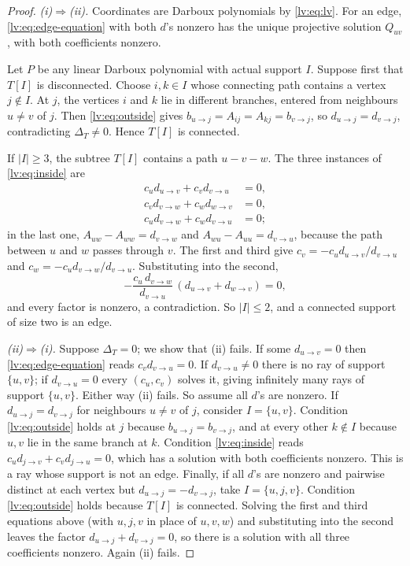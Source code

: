 \documentclass[11pt,a4paper]{article}
\theoremstyle{definition}
\theoremstyle{remark}
\begin{document}
\begin{proof}
\emph{(i)$\Rightarrow$(ii).} Coordinates are Darboux polynomials by \eqref{lv:eq:lv}. For an edge, \eqref{lv:eq:edge-equation} with both $d$'s nonzero has the unique projective solution $Q_{uv}$, with both coefficients nonzero.

Let $P$ be any linear Darboux polynomial with actual support $I$. Suppose first that $T[I]$ is disconnected. Choose $i,k\in I$ whose connecting path contains a vertex $j\notin I$. At $j$, the vertices $i$ and $k$ lie in different branches, entered from neighbours $u\neq v$ of $j$. Then \eqref{lv:eq:outside} gives $b_{u\to j}=A_{ij}=A_{kj}=b_{v\to j}$, so $d_{u\to j}=d_{v\to j}$, contradicting $\Delta_T\neq0$. Hence $T[I]$ is connected.

If $|I|\geq3$, the subtree $T[I]$ contains a path $u-v-w$. The three instances of \eqref{lv:eq:inside} are
\begin{align*}
 c_u d_{u\to v}+c_v d_{v\to u}&=0,\\
 c_v d_{v\to w}+c_w d_{w\to v}&=0,\\
 c_u d_{v\to w}+c_w d_{v\to u}&=0;
\end{align*}
in the last one, $A_{uw}-A_{ww}=d_{v\to w}$ and $A_{wu}-A_{uu}=d_{v\to u}$, because the path between $u$ and $w$ passes through $v$. The first and third give $c_v=-c_u d_{u\to v}/d_{v\to u}$ and $c_w=-c_u d_{v\to w}/d_{v\to u}$. Substituting into the second,
\[
 -\frac{c_u\,d_{v\to w}}{d_{v\to u}}\,(d_{u\to v}+d_{w\to v})=0,
\]
and every factor is nonzero, a contradiction. So $|I|\leq2$, and a connected support of size two is an edge.

\emph{(ii)$\Rightarrow$(i).} Suppose $\Delta_T=0$; we show that (ii) fails. If some $d_{u\to v}=0$ then \eqref{lv:eq:edge-equation} reads $c_vd_{v\to u}=0$. If $d_{v\to u}\neq0$ there is no ray of support $\{u,v\}$; if $d_{v\to u}=0$ every $(c_u,c_v)$ solves it, giving infinitely many rays of support $\{u,v\}$. Either way (ii) fails. So assume all $d$'s are nonzero. If $d_{u\to j}=d_{v\to j}$ for neighbours $u\neq v$ of $j$, consider $I=\{u,v\}$. Condition \eqref{lv:eq:outside} holds at $j$ because $b_{u\to j}=b_{v\to j}$, and at every other $k\notin I$ because $u,v$ lie in the same branch at $k$. Condition \eqref{lv:eq:inside} reads $c_ud_{j\to v}+c_vd_{j\to u}=0$, which has a solution with both coefficients nonzero. This is a ray whose support is not an edge. Finally, if all $d$'s are nonzero and pairwise distinct at each vertex but $d_{u\to j}=-d_{v\to j}$, take $I=\{u,j,v\}$. Condition \eqref{lv:eq:outside} holds because $T[I]$ is connected. Solving the first and third equations above (with $u,j,v$ in place of $u,v,w$) and substituting into the second leaves the factor $d_{u\to j}+d_{v\to j}=0$, so there is a solution with all three coefficients nonzero. Again (ii) fails.
\end{proof}
\end{document}

